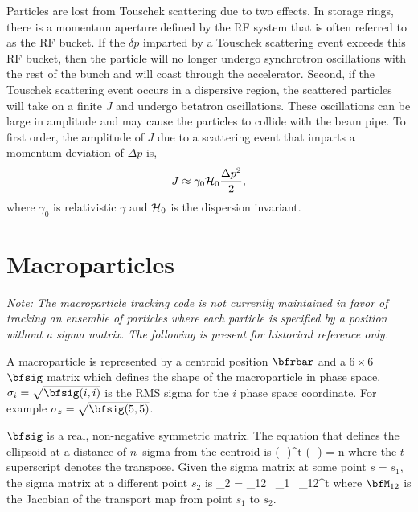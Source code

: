 Particles are lost from Touschek scattering due to two effects.  In
storage rings, there is a momentum aperture defined by the RF system
that is often referred to as the RF bucket.  If the $\delta p$
imparted by a Touschek scattering event exceeds this RF bucket, then
the particle will no longer undergo synchrotron oscillations with the
rest of the bunch and will coast through the accelerator.  Second, if
the Touschek scattering event occurs in a dispersive region, the
scattered particles will take on a finite $J$ and undergo betatron
oscillations.  These oscillations can be large in amplitude and may
cause the particles to collide with the beam pipe.  To first order,
the amplitude of $J$ due to a scattering event that imparts a momentum
deviation of $\Delta p$ is,
\begin{equation}
  J\approx\gamma_0{\cal H}_0\frac{\Delta p^2}{2},
\end{equation}
where $\gamma_0$ is relativistic $\gamma$ and ${\cal H}_0$ is the dispersion invariant.

\section{Macroparticles}
\label{s:macro}

{\em Note: The macroparticle tracking code is not currently maintained in favor of tracking an
ensemble of particles where each particle is specified by a position without a sigma matrix. The 
following is present for historical reference only.}

A macroparticle\cite{b:transport.appendix} is
represented by a centroid position $\bfrbar$ and a $6 \times 6$
$\bfsig$ matrix which defines the shape of the macroparticle in
phase space. $\sigma_i = \sqrt{\bfsig(i,i)}$ is the RMS sigma for the $i$\Th
phase space coordinate. For example $\sigma_z = \sqrt{\bfsig(5,5)}$.

$\bfsig$ is a real, non-negative symmetric matrix. The equation that
defines the ellipsoid at a distance of $n$--sigma from the centroid is
\Begineq
  (\bfr - \bfrbar)^t \bfsig\inv (\bfr - \bfrbar) = n
\Endeq
where the $t$ superscript denotes the transpose. Given the sigma matrix
at some point $s = s_1$, the sigma matrix at a different point $s_2$ is
\Begineq
  \bfsig_2 = \bfM_{12} \, \bfsig_1 \, \bfM_{12}^t
\Endeq
where $\bfM_{12}$ is the Jacobian of the transport map from point
$s_1$ to $s_2$.

